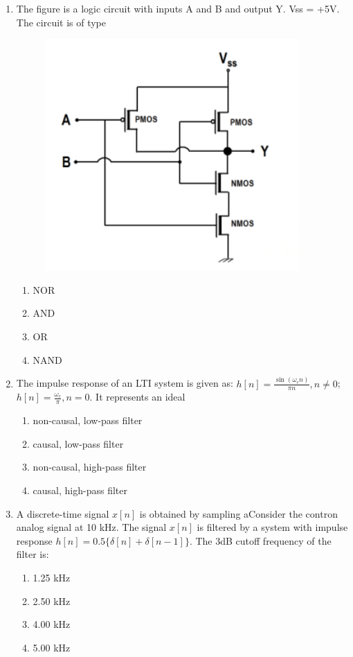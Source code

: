\documentclass[journal,12pt,onecolumn]{IEEEtran}
\theoremstyle{remark}
\begin{document}
\begin{enumerate}
    \item The figure is a logic circuit with inputs A and B and output Y. Vss = +5V. The circuit is of type
    \begin{figure}[H]
        \centering
        \includegraphics[width=0.4\columnwidth]{q17}
        \caption*{}
        \label{fig:placeholder}
    \end{figure}
    \begin{multicols}{4}
        \begin{enumerate}
            \item NOR
            \item AND
            \item OR
            \item NAND
        \end{enumerate}
    \end{multicols}

    \item The impulse response of an LTI system is given as:
    $h[n] = \frac{\sin(\omega_c n)}{\pi n}, n \neq 0$; $h[n] = \frac{\omega_c}{\pi}, n=0$. It represents an ideal
    \begin{multicols}{2}
        \begin{enumerate}
            \item non-causal, low-pass filter
            \item causal, low-pass filter
            \item non-causal, high-pass filter
            \item causal, high-pass filter
        \end{enumerate}
    \end{multicols}

    \item A discrete-time signal $x[n]$ is obtained by sampling aConsider the contron analog signal at 10 kHz. The signal $x[n]$ is filtered by a system with impulse response $h[n] = 0.5\{\delta[n] + \delta[n-1]\}$. The 3dB cutoff frequency of the filter is:
    \begin{multicols}{4}
        \begin{enumerate}
            \item 1.25 kHz
            \item 2.50 kHz
            \item 4.00 kHz
            \item 5.00 kHz
        \end{enumerate}
    \end{multicols}


\end{enumerate}
\end{document}
